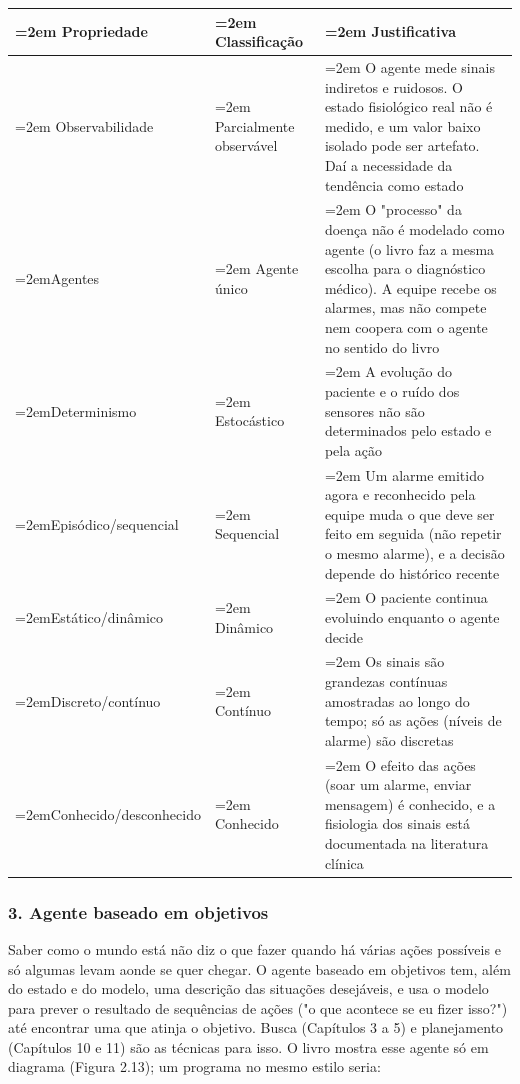 \documentclass[12pt, a4paper]{article}
\begin{document}
\begingroup
\setlength{\tabcolsep}{4.0pt}
\begin{longtable}{@{}>{\raggedright\hyphenpenalty=30\tolerance=999\emergencystretch=2em\arraybackslash}p{4.50cm}>{\raggedright\hyphenpenalty=30\tolerance=999\emergencystretch=2em\arraybackslash}p{2.50cm}>{\raggedright\hyphenpenalty=30\tolerance=999\emergencystretch=2em\arraybackslash}p{7.72cm}@{}}
\toprule\noalign{}
Propriedade & Clas\-si\-fi\-ca\-ção & Justificativa \\
\midrule\noalign{}
\endhead
\bottomrule\noalign{}
\endlastfoot
Observabilidade & Parcialmente ob\-ser\-vá\-vel & O agente mede sinais indiretos e ruidosos. O estado fi\-si\-o\-ló\-gico real não é medido, e um valor baixo isolado pode ser artefato. Daí a necessidade da tendência como estado \\
Agentes & Agente único & O "processo" da doença não é modelado como agente (o livro faz a mesma escolha para o di\-ag\-nós\-tico médico\allowbreak ). A equipe recebe os alarmes, mas não compete nem coopera com o agente no sentido do livro \\
Determinismo & Es\-to\-cás\-tico & A evolução do paciente e o ruído dos sensores não são determinados pelo estado e pela ação \\
Episódico\slash sequencial & Sequencial & Um alarme emitido agora e reconhecido pela equipe muda o que deve ser feito em seguida (não repetir o mesmo alarme\allowbreak ), e a decisão depende do histórico recente \\
Estático\slash dinâmico & Dinâmico & O paciente continua evoluindo enquanto o agente decide \\
Discreto\slash contínuo & Contínuo & Os sinais são grandezas contínuas amostradas ao longo do tempo; só as ações (níveis de alarme\allowbreak ) são discretas \\
Conhecido\slash desconhecido & Conhecido & O efeito das ações (soar um alarme, enviar mensagem\allowbreak ) é conhecido, e a fisiologia dos sinais está documentada na literatura clínica \\
\end{longtable}
\endgroup

\subsubsection{3. Agente baseado em objetivos}\label{3-agente-baseado-em-objetivos}

Saber como o mundo está não diz o que fazer quando há várias ações possíveis e só algumas levam aonde se quer chegar. O agente baseado em objetivos tem, além do estado e do modelo, uma descrição das situações desejáveis, e usa o modelo para prever o resultado de sequências de ações ("o que acontece se eu fizer isso?") até encontrar uma que atinja o objetivo. Busca (Capítulos 3 a 5) e planejamento (Capítulos 10 e 11) são as técnicas para isso. O livro mostra esse agente só em diagrama (Figura 2.13); um programa no mesmo estilo seria:
\end{document}
